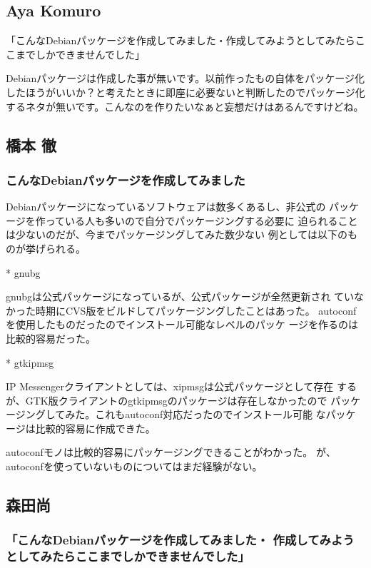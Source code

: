 \documentclass[mingoth,a4paper]{jsarticle}
\begin{document}
\subsection{Aya Komuro}

「こんなDebianパッケージを作成してみました・作成してみようとしてみたらこ
こまでしかできませんでした」

Debianパッケージは作成した事が無いです。以前作ったもの自体をパッケージ化
したほうがいいか？と考えたときに即座に必要ないと判断したのでパッケージ化
するネタが無いです。こんなのを作りたいなぁと妄想だけはあるんですけどね。

\subsection{橋本 徹}

\subsubsection{こんなDebianパッケージを作成してみました}

Debianパッケージになっているソフトウェアは数多くあるし、非公式の
パッケージを作っている人も多いので自分でパッケージングする必要に
迫られることは少ないのだが、今までパッケージングしてみた数少ない
例としては以下のものが挙げられる。

* gnubg

gnubgは公式パッケージになっているが、公式パッケージが全然更新され
ていなかった時期にCVS版をビルドしてパッケージングしたことはあった。
autoconfを使用したものだったのでインストール可能なレベルのパッケ
ージを作るのは比較的容易だった。

* gtkipmsg

IP Messengerクライアントとしては、xipmsgは公式パッケージとして存在
するが、GTK版クライアントのgtkipmsgのパッケージは存在しなかったので
パッケージングしてみた。これもautoconf対応だったのでインストール可能
なパッケージは比較的容易に作成できた。

autoconfモノは比較的容易にパッケージングできることがわかった。
が、autoconfを使っていないものについてはまだ経験がない。

\subsection{森田尚}

\subsubsection{「こんなDebianパッケージを作成してみました・
作成してみようとしてみたらここまでしかできませんでした」}
\end{document}
